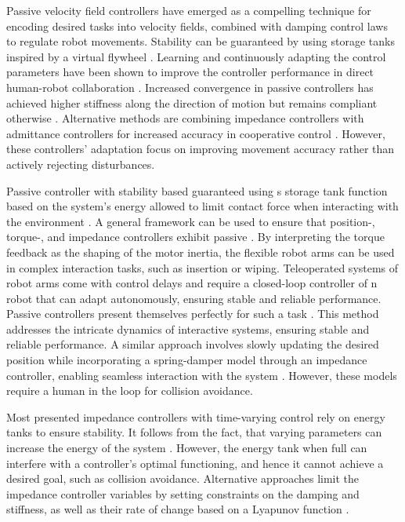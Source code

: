 Passive velocity field controllers have emerged as a compelling technique for encoding desired tasks into velocity fields, combined with damping control laws to regulate robot movements. Stability can be guaranteed by using storage tanks inspired by a virtual flywheel \cite{li1999passive}. 
Learning and continuously adapting the control parameters have been shown to improve the controller performance in direct human-robot collaboration 
\cite{gribovskaya2011motion}.
Increased convergence in passive controllers has achieved higher stiffness along the direction of motion but remains compliant otherwise \cite{kronander2015passive}. 
Alternative methods are combining impedance controllers with admittance controllers for increased accuracy in cooperative control
\cite{fujiki2022series}.
However, these controllers' adaptation focus on improving movement accuracy rather than actively rejecting disturbances.

Passive controller with stability based guaranteed using s storage tank function based on the system's energy allowed to limit contact force when interacting with the environment \cite{kishi2003passive}.
A general framework can be used to ensure that position-, torque-, and impedance controllers exhibit passive \cite{albu2007unified}. By interpreting the torque feedback as the shaping of the motor inertia, the flexible robot arms can be used in complex interaction tasks, such as insertion or wiping.
Teleoperated systems of robot arms come with control delays and require a closed-loop controller of n robot that can adapt autonomously, ensuring stable and reliable performance. Passive controllers present themselves perfectly for such a task  \cite{stramigioli2005sampled}. This method addresses the intricate dynamics of interactive systems, ensuring stable and reliable performance.
A similar approach involves slowly updating the desired position while incorporating a spring-damper model through an impedance controller, enabling seamless interaction with the system \cite{lee2010passive}.
However, these models require a human in the loop for collision avoidance.

Most presented impedance controllers with time-varying control rely on energy tanks to ensure stability. 
It follows from the fact, that varying parameters can increase the energy of the system \cite{ferraguti2013tank}. However, the energy tank when full can interfere with a controller's optimal functioning, and hence it cannot achieve a desired goal, such as collision avoidance.
Alternative approaches limit the impedance controller variables  by setting constraints on the damping and stiffness, as well as their rate of change based on a Lyapunov function \cite{kronander2016stability}.

